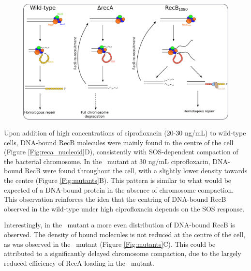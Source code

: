 \begin{figure}[htbp]
    \centering
    \includegraphics[width=\textwidth]{Figures/Fig_mutants_pathways.pdf}
    \caption{}
    \label{Fig:pathways}
\end{figure}

Upon addition of high concentrations of ciprofloxacin (20-30 ng/mL) to wild-type cells, DNA-bound RecB molecules were mainly found in the centre of the cell (Figure \ref{Fig:reca_nucleoid}D), consistently with SOS-dependent compaction of the bacterial chromosome. In the \dreca\ mutant at 30 ng/mL ciprofloxacin, DNA-bound RecB were found throughout the cell, with a slightly lower density towards the centre (Figure \ref{Fig:mutants}B). This pattern is similar to what would be expected of a DNA-bound protein in the absence of chromosome compaction\cite{Stracy2021}. This observation reinforces the idea that the centring of DNA-bound RecB observed in the wild-type under high ciprofloxacin depends on the SOS response.

Interestingly, in the \teneighty\ mutant a more even distribution of DNA-bound RecB is observed. The density of bound molecules is not reduced at the centre of the cell, as was observed in the \dreca\ mutant (Figure \ref{Fig:mutants}C). This could be attributed to a significantly delayed chromosome compaction, due to the largely reduced efficiency of RecA loading in the \teneighty\ mutant.

